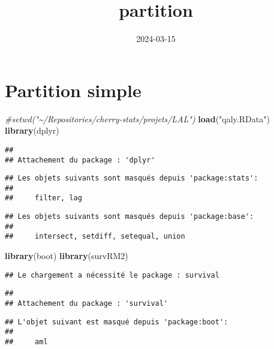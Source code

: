 \documentclass[
]{article}
\title{partition}
\author{}
\date{\vspace{-2.5em}2024-03-15}
\newenvironment{Shaded}{\begin{snugshade}}{\end{snugshade}}
\newcommand{\CommentTok}[1]{\textcolor[rgb]{0.56,0.35,0.01}{\textit{#1}}}
\newcommand{\FunctionTok}[1]{\textcolor[rgb]{0.13,0.29,0.53}{\textbf{#1}}}
\newcommand{\NormalTok}[1]{#1}
\newcommand{\StringTok}[1]{\textcolor[rgb]{0.31,0.60,0.02}{#1}}
\begin{document}
\maketitle

\hypertarget{partition-simple}{%
\section{Partition simple}\label{partition-simple}}

\begin{Shaded}
\begin{Highlighting}[]
\CommentTok{\#setwd("\textasciitilde{}/Repositories/cherry{-}stats/projets/LAL")}
\FunctionTok{load}\NormalTok{(}\StringTok{"qaly.RData"}\NormalTok{)}
\FunctionTok{library}\NormalTok{(dplyr)}
\end{Highlighting}
\end{Shaded}

\begin{verbatim}
## 
## Attachement du package : 'dplyr'
\end{verbatim}

\begin{verbatim}
## Les objets suivants sont masqués depuis 'package:stats':
## 
##     filter, lag
\end{verbatim}

\begin{verbatim}
## Les objets suivants sont masqués depuis 'package:base':
## 
##     intersect, setdiff, setequal, union
\end{verbatim}

\begin{Shaded}
\begin{Highlighting}[]
\FunctionTok{library}\NormalTok{(boot)}
\FunctionTok{library}\NormalTok{(survRM2)}
\end{Highlighting}
\end{Shaded}

\begin{verbatim}
## Le chargement a nécessité le package : survival
\end{verbatim}

\begin{verbatim}
## 
## Attachement du package : 'survival'
\end{verbatim}

\begin{verbatim}
## L'objet suivant est masqué depuis 'package:boot':
## 
##     aml
\end{verbatim}
\end{document}
